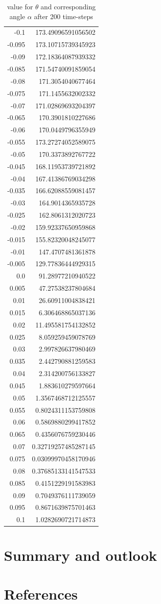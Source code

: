 \documentclass{mimosis}
\begin{document}
\begin{longtable}{rr}
\caption{\label{angle-table}value for \(\theta\) and corresponding angle \(\alpha\) after 200 time-steps}
\\
-0.1 & 173.49096591056502\\
-0.095 & 173.10715739345923\\
-0.09 & 172.18364087939332\\
-0.085 & 171.54740091859054\\
-0.08 & 171.3054040677464\\
-0.075 & 171.1455632002332\\
-0.07 & 171.02869693204397\\
-0.065 & 170.3901810227686\\
-0.06 & 170.0449796355949\\
-0.055 & 173.27274052589075\\
-0.05 & 170.3373892767722\\
-0.045 & 168.11953739721892\\
-0.04 & 167.41386769034298\\
-0.035 & 166.62088559081457\\
-0.03 & 164.9014365935728\\
-0.025 & 162.8061312020723\\
-0.02 & 159.92337650959868\\
-0.015 & 155.82320048245077\\
-0.01 & 147.4707481361878\\
-0.005 & 129.77836444929315\\
0.0 & 91.28977210940522\\
0.005 & 47.27538237804684\\
0.01 & 26.60911004838421\\
0.015 & 6.306468865037136\\
0.02 & 11.495581754132852\\
0.025 & 8.059259459078769\\
0.03 & 2.997826637980469\\
0.035 & 2.442790881259583\\
0.04 & 2.314200756133827\\
0.045 & 1.883610279597664\\
0.05 & 1.3567468712125557\\
0.055 & 0.8024311153759808\\
0.06 & 0.5869880299417852\\
0.065 & 0.4356076759230446\\
0.07 & 0.32719257485287145\\
0.075 & 0.03099970458170946\\
0.08 & 0.37685133141547533\\
0.085 & 0.4151229191583983\\
0.09 & 0.7049376111739059\\
0.095 & 0.8671639875701463\\
0.1 & 1.0282690721714873\\
\end{longtable}
\chapter{Summary and outlook}
\label{sec:orgf6aebb1}

\chapter{References}
\label{sec:orgf03e281}
\printbibliography
\end{document}
